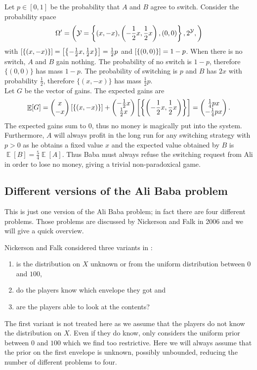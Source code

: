 \documentclass[a4paper]{report}
\theoremstyle{plain}
\theoremstyle{definition}
\theoremstyle{remark}
\numberwithin{equation}{chapter}
\let\P\relax
\DeclareMathOperator{\P}{\mathbb{P}}
\DeclareMathOperator{\E}{\mathbb{E}}
\DeclareMathOperator{\1}{\mathbbm{1}}
\newcommand{\Y}{\mathcal{Y}}
\begin{document}
Let $p\in[0,1]$ be the probability that $A$ and $B$ agree to switch. Consider the probability space
\begin{equation}
\Omega'=\left(\Y=\left\{(x,-x),\left(-\frac{1}{2}x,\frac{1}{2}x\right),(0,0)\right\},2^\Y,\P\right)
\end{equation}
with $\P[\{(x,-x)\}]=\P\left[\left\{-\frac{1}{2}x,\frac{1}{2}x\right\}\right]=\frac{1}{2}p$ and $\P[\{(0,0)\}]=1-p$. When there is no switch, $A$ and $B$ gain nothing. The probability of no switch is $1-p$, therefore $\{(0,0)\}$ has mass $1-p$. The probability of switching is $p$ and $B$ has $2x$ with probability $\frac{1}{2}$, therefore $\{(x,-x)\}$ has mass $\frac{1}{2}p$.\\
Let $G$ be the vector of gains. The expected gains are
\begin{align}
\E[G]=\begin{pmatrix}x\\-x\end{pmatrix}\P[\{(x,-x)\}]+\begin{pmatrix}-\frac{1}{2}x\\\frac{1}{2}x\end{pmatrix}\P\left[\left\{\left(-\frac{1}{2}x,\frac{1}{2}x\right)\right\}\right]=\begin{pmatrix}\frac{1}{4}px\\-\frac{1}{4}px\end{pmatrix}.
\end{align}
The expected gains sum to $0$, thus no money is magically put into the system. Furthermore, $A$ will always profit in the long run for any switching strategy with $p>0$ as he obtains a fixed value $x$ and the expected value obtained by $B$ is $\E[B]=\frac{5}{4}\E[A]$. Thus Baba must always refuse the switching request from Ali in order to lose no money, giving a trivial non-paradoxical game.

\subsection{Different versions of the Ali Baba problem}
This is just one version of the Ali Baba problem; in fact there are four different problems. Those problems are discussed by Nickerson and Falk in 2006 \cite{Nickerson06} and we will give a quick overview.

Nickerson and Falk considered three variants in \cite{Nickerson06}:
\begin{enumerate}
\item is the distribution on $X$ unknown or from the uniform distribution between $0$ and $100$,
\item do the players know which envelope they got and
\item are the players able to look at the contents?
\end{enumerate}
The first variant is not treated here as we assume that the players do not know the distribution on $X$. Even if they do know, \cite{Nickerson06} only considers the uniform prior between $0$ and $100$ which we find too restrictive. Here we will always assume that the prior on the first envelope is unknown, possibly unbounded, reducing the number of different problems to four.
\end{document}
